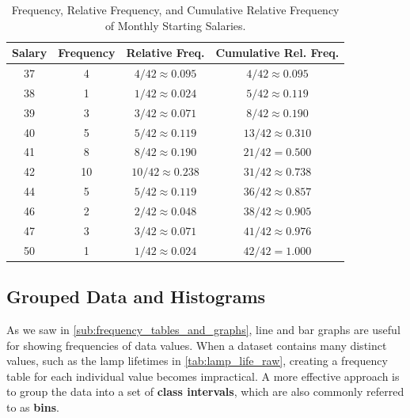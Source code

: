 \begin{table}[htbp]
\centering
\renewcommand{\arraystretch}{1.3}
{
\begin{tabular}{cccc}
\toprule
\textbf{Salary} & \textbf{Frequency} & \textbf{Relative Freq.} & \textbf{Cumulative Rel. Freq.} \\
\midrule
37 & 4 & $4/42 \approx 0.095$ & $4/42 \approx 0.095$ \\
38 & 1 & $1/42 \approx 0.024$ & $5/42 \approx 0.119$ \\
39 & 3 & $3/42 \approx 0.071$ & $8/42 \approx 0.190$ \\
40 & 5 & $5/42 \approx 0.119$ & $13/42 \approx 0.310$ \\
41 & 8 & $8/42 \approx 0.190$ & $21/42 = 0.500$ \\
42 & 10 & $10/42 \approx 0.238$ & $31/42 \approx 0.738$ \\
44 & 5 & $5/42 \approx 0.119$ & $36/42 \approx 0.857$ \\
46 & 2 & $2/42 \approx 0.048$ & $38/42 \approx 0.905$ \\
47 & 3 & $3/42 \approx 0.071$ & $41/42 \approx 0.976$ \\
50 & 1 & $1/42 \approx 0.024$ & $42/42 = 1.000$ \\
\bottomrule
\end{tabular}
}
\caption{Frequency, Relative Frequency, and Cumulative Relative Frequency of Monthly Starting Salaries.}
\label{tab:salary_full_freq}
\end{table}

\newpage

\subsection*{Grouped Data and Histograms}

As we saw in \autoref{sub:frequency_tables_and_graphs}, line and bar graphs are useful for showing frequencies of data values. When a dataset contains many distinct values, such as the lamp lifetimes in \autoref{tab:lamp_life_raw}, creating a frequency table for each individual value becomes impractical. A more effective approach is to group the data into a set of \textbf{class intervals}, which are also commonly referred to as \textbf{bins}.

